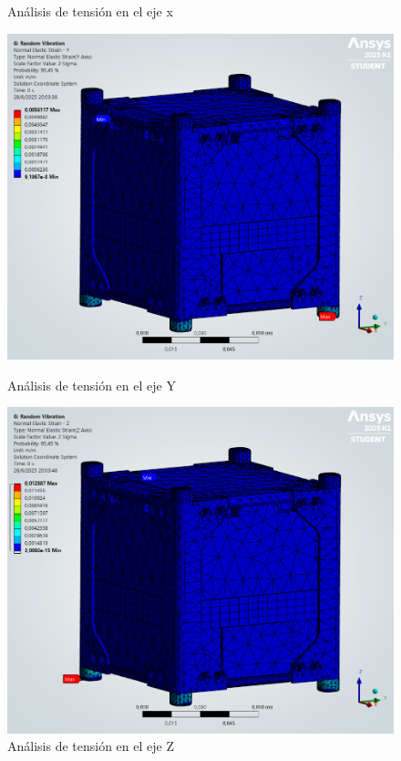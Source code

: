 \begin{figure}[h]
\begin{minipage}{0.5\textwidth}
          \caption{Análisis de tensión en el eje x}
          \label{fig:fem_strain-x}
        \end{minipage}
      \end{figure}
      \begin{figure}[H]
        \begin{minipage}{0.5\textwidth}
          \centering
          \includegraphics[width=\textwidth]{image/fem/ansys_cubesat-vibration_strain-y.png}
          \caption{Análisis de tensión en el eje Y}
          \label{fig:fem_strain-y}
        \end{minipage}
        \begin{minipage}{0.5\textwidth}
          \centering
          \includegraphics[width=\textwidth]{image/fem/ansys_cubesat-vibration_strain-z.png}
          \caption{Análisis de tensión en el eje Z}
          \label{fig:fem_strain-z}
        \end{minipage}
      \end{figure}

